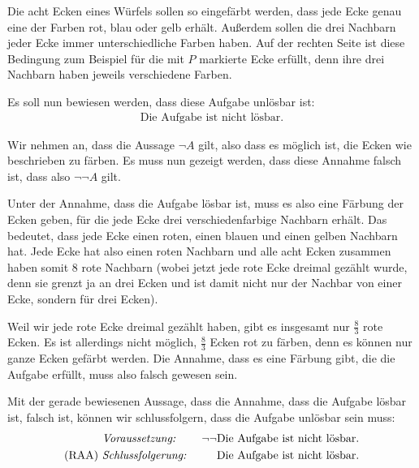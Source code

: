 \documentclass[../../main.tex]{subfiles}
\begin{document}
\begin{example}{}
    Die acht Ecken eines Würfels sollen so eingefärbt werden, dass jede Ecke genau eine der Farben rot, blau oder gelb erhält. Außerdem sollen die drei Nachbarn jeder Ecke immer unterschiedliche Farben haben. Auf der rechten Seite ist diese Bedingung zum Beispiel für die mit $P$ markierte Ecke erfüllt, denn ihre drei Nachbarn haben jeweils verschiedene Farben.

    Es soll nun bewiesen werden, dass diese Aufgabe unlösbar ist:
    \begin{align*}
    \tag {A}\text{Die~Aufgabe~ist~nicht~lösbar.}
    \end{align*}

    Wir nehmen an, dass die Aussage $\lnot A$ gilt, also dass es möglich ist, die Ecken wie beschrieben zu färben. Es muss nun gezeigt werden, dass diese Annahme falsch ist, dass also $\lnot\lnot A$ gilt.

    Unter der Annahme, dass die Aufgabe lösbar ist, muss es also eine Färbung der Ecken geben, für die jede Ecke drei verschiedenfarbige Nachbarn erhält. Das bedeutet, dass jede Ecke einen roten, einen blauen und einen gelben Nachbarn hat. Jede Ecke hat also einen roten Nachbarn und alle acht Ecken zusammen haben somit $8$ rote Nachbarn (wobei jetzt jede rote Ecke dreimal gezählt wurde, denn sie grenzt ja an drei Ecken und ist damit nicht nur der Nachbar von einer Ecke, sondern für drei Ecken). 
    
    Weil wir jede rote Ecke dreimal gezählt haben, gibt es insgesamt nur $\frac{8}{3}$ rote Ecken. Es ist allerdings nicht möglich, $\frac{8}{3}$ Ecken rot zu färben, denn es können nur ganze Ecken gefärbt werden. Die Annahme, dass es eine Färbung gibt, die die Aufgabe erfüllt, muss also falsch gewesen sein.

    Mit der gerade bewiesenen Aussage, dass die Annahme, dass die Aufgabe lösbar ist, falsch ist, können wir schlussfolgern, dass die Aufgabe unlösbar sein muss:
    \begin{align*}
        &\text{\emph{Voraussetzung:}}~&\lnot\lnot\text{Die~Aufgabe~ist~nicht~lösbar.}\\
        \text{(RAA)}~&\text{\emph{Schlussfolgerung:}}~&\text{Die~Aufgabe~ist~nicht~lösbar.}
    \end{align*}    
\end{example}
\end{document}
